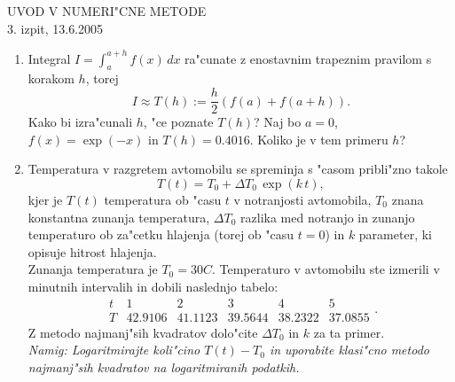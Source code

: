 \documentclass[11pt,a4paper]{article}
\begin{document}
\begin{center}
  {\large UVOD V NUMERI"CNE METODE\\
    3. izpit, 13.6.2005\\
    }
\end{center}
\vspace{1cm}

\begin{enumerate}
  
  \item Integral $I=\int_{a}^{a+h} f(x)\,dx$ ra"cunate z enostavnim
      trapeznim pravilom s korakom $h$, torej
      $$ I\approx T(h):=\frac{h}{2}\left(f(a)+f(a+h)\right).$$
      Kako bi izra"cunali $h$, "ce poznate $T(h)$?
      Naj bo $a=0$, $f(x)=\exp(-x)$ in $T(h)=0.4016$. Koliko je v tem
      primeru $h$?

  \item Temperatura v razgretem avtomobilu se spreminja s 
    "casom pribli"zno takole
    $$T(t)=T_0+\Delta T_0\,\exp(k\,t),$$
    kjer je $T(t)$ temperatura ob
    "casu $t$ v notranjosti avtomobila, $T_0$ znana konstantna zunanja
    temperatura, $\Delta T_0$ razlika med notranjo in zunanjo
    temperaturo ob za"cetku hlajenja (torej ob "casu $t=0$) in $k$
    parameter, ki opisuje hitrost hlajenja.\\
    Zunanja temperatura je $T_0=30C$. Temperaturo v 
    avtomobilu ste izmerili v minutnih intervalih in dobili naslednjo
    tabelo:%
    $$
      \begin{array}{c|ccccc}
        t & 1 & 2 & 3 & 4 & 5\\ \hline
        T & 42.9106 & 41.1123 & 39.5644 & 38.2322 & 37.0855
      \end{array}.
    $$
    Z metodo najmanj"sih kvadratov dolo"cite $\Delta T_0$ in $k$ za ta primer.\\
    {\sl Namig: Logaritmirajte koli"cino $T(t)-T_0$ in uporabite klasi"cno
    metodo najmanj"sih kvadratov na logaritmiranih podatkih.}
        

\end{enumerate}
\end{document}
